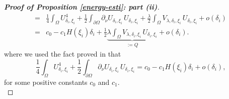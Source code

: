 \documentclass[a4paper,reqno,11pt,oneside]{amsart}
\numberwithin{equation}{section}
\begin{document}
\begin{proof}[\textbf{Proof of Proposition \eqref{energy-esti}: part (ii)}]
\begin{align}
=&\frac{1}{4} \displaystyle\int_{\Omega}U_{\delta_i,\xi_i}^4+\frac{1}{2}\displaystyle\int_{\partial\Omega}\partial_{\nu}U_{\delta_i,\xi_i} \,U_{\delta_i,\xi_i}+\frac{\lambda}{2}\displaystyle\int_{\Omega}V_{\lambda,\delta_i,\xi_i}\,U_{\delta_i,\xi_i}+o(\delta_i)\nonumber\\=&c_0-c_1H(\xi_i)\delta_i+\frac{1}{2}\underbrace{\lambda{\displaystyle\int_{\Omega}V_{\lambda,\delta_i,\xi_i}\,U_{\delta_i,\xi_i}}}_{:=Q}+o(\delta_i).
\end{align}
 where we used the fact proved in \cite[Lemma 2.2]{adi-man}  that
$$\frac{1}{4} \displaystyle\int_{\Omega}U_{\delta_i,\xi_i}^4+\frac{1}{2}\displaystyle\int_{\partial\Omega}\partial_{\nu}U_{\delta_i,\xi_i} \,U_{\delta_i,\xi_i}=c_0-c_1H(\xi_i)\delta_i+o(\delta_i),$$
for some positive constants $c_0$ and $c_1$.
\\


\end{proof}
\end{document}
